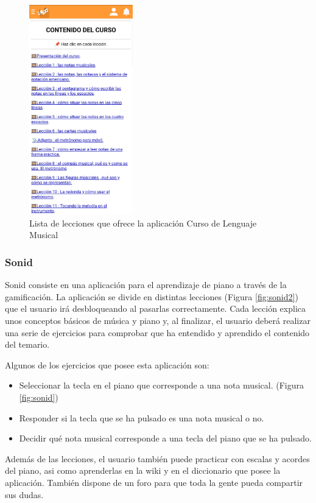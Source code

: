 \begin{figure}[H]
    \centering
    \includegraphics[width=0.4\textwidth]{imagenes/c2/cursomusica.jpeg}
    \caption{Lista de lecciones que ofrece la aplicación Curso de Lenguaje Musical}
    \label{fig:clm}
\end{figure}


\subsubsection{Sonid}
Sonid consiste en una aplicación para el aprendizaje de piano a través de la gamificación.
La aplicación se divide en distintas lecciones (Figura \ref{fig:sonid2}) que el usuario irá desbloqueando al pasarlas correctamente.
Cada lección explica unos conceptos básicos de música y piano y, al finalizar, el usuario deberá realizar una serie
de ejercicios para comprobar que ha entendido y aprendido el contenido del temario.

Algunos de los ejercicios que posee esta aplicación son:
\begin{itemize}
    \item Seleccionar la tecla en el piano que corresponde a una nota musical. (Figura \ref{fig:sonid})
    \item Responder si la tecla que se ha pulsado es una nota musical o no.
    \item Decidir qué nota musical corresponde a una tecla del piano que se ha pulsado.
\end{itemize}

Además de las lecciones, el usuario también puede practicar con escalas y acordes del piano, asi como aprenderlas en la wiki y en el diccionario que 
posee la aplicación. También dispone de un foro para que toda la gente pueda compartir sus dudas.

